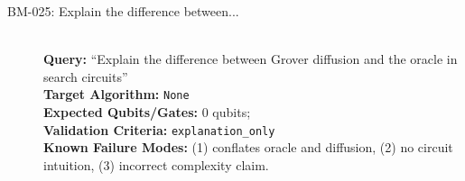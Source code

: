 \begin{description}
    \item[BM-025: Explain the difference between...] \ \\
    \textbf{Query:} ``Explain the difference between Grover diffusion and the oracle in search circuits'' \\
    \textbf{Target Algorithm:} \texttt{None} \\
    \textbf{Expected Qubits/Gates:} 0 qubits; \texttt{} \\
    \textbf{Validation Criteria:} \texttt{explanation\_only} \\
    \textbf{Known Failure Modes:} (1) conflates oracle and diffusion, (2) no circuit intuition, (3) incorrect complexity claim.

\end{description}